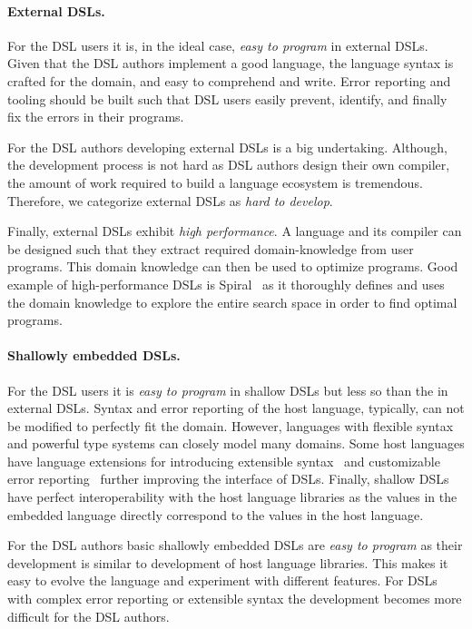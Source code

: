 \paragraph{External DSLs.} For the DSL users it is, in the ideal case, \emph{easy to program} in external DSLs.
 Given that the DSL authors implement a good language, the language syntax is crafted
 for the domain, and easy to comprehend and write. Error reporting and tooling should
 be built such that DSL users easily prevent, identify, and finally fix the errors in
 their programs.

For the DSL authors developing external DSLs is a big undertaking. Although, the development
 process is not hard as DSL authors design their own compiler, the amount of work
 required to build a language ecosystem is tremendous. Therefore, we categorize
 external DSLs as \emph{hard to develop}.

Finally, external DSLs exhibit \emph{high performance}. A language and its compiler can be
 designed such that they extract required domain-knowledge from user programs. This domain knowledge
 can then be used to optimize programs. Good example of high-performance DSLs is
 Spiral~\cite{puschel2005spiral} as it thoroughly defines and uses the domain
 knowledge to explore the entire search space in order to find optimal programs.


\paragraph{Shallowly embedded DSLs.} For the DSL users it is \emph{easy to program} in
 shallow DSLs  but less so than the in external DSLs. Syntax and error reporting of the host language,
 typically, can not be modified to perfectly fit the domain. However, languages with
 flexible syntax~\cite{moors_scala-virtualized_2012,odersky2010contracts} and
 powerful type systems can closely model many domains. Some host languages have
 language extensions for introducing extensible syntax~\cite{SugarJ} and customizable error reporting~\cite{hage2007heuristics,heeren2003scripting} further improving the interface of DSLs. Finally, shallow DSLs have
 perfect interoperability with the host language libraries as the values in the embedded
 language directly correspond to the values in the host language.

For the DSL authors basic shallowly embedded DSLs are \emph{easy to program} as their
 development is similar to development of host language libraries. This makes it easy
 to evolve the language and experiment with different features. For DSLs
 with complex error reporting or extensible syntax the development
 becomes more difficult for the DSL authors.

